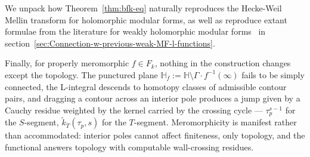 \documentclass[11pt]{article}
\numberwithin{equation}{section}  %
\newcommand{\HH}{\mathbb{H}}
\begin{document}
We unpack how Theorem~\ref{thm:bfk-eq} naturally reproduces the
Hecke-Weil Mellin transform for holomorphic modular forms, as
well as reproduce extant formulae from the literature for weakly
holomorphic modular forms~\cite{BFK2011} in section~\ref{sec:Connection-w-previous-weak-MF-l-functions}.

Finally, for properly meromorphic $f \in F_k$, nothing in the
construction changes except the topology.  The punctured plane
$\HH_f := \HH \setminus \Gamma\!\cdot\! f^{-1}(\infty)$ fails to be
simply connected, the L-integral descends to homotopy classes of
admissible contour pairs, and dragging a contour across an interior pole
produces a jump given by a Cauchy residue weighted by the kernel carried
by the crossing cycle --- $\tau_p^{s-1}$ for the $S$-segment,
$\widetilde{k}_T(\tau_p, s)$ for the $T$-segment.  Meromorphicity is
manifest rather than accommodated: interior poles cannot affect
finiteness, only topology, and the functional answers topology with
computable wall-crossing residues.
\end{document}
